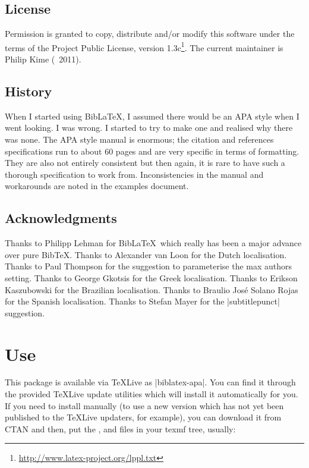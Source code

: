 \documentclass{ltxdockit}
\begin{document}
\subsection{License}

Permission is granted to copy, distribute and/or modify this software under
the terms of the \latex Project Public License, version
1.3c\footnote{\url{http://www.latex-project.org/lppl.txt}}. The current
maintainer is Philip Kime (\textcopyright\ 2011).

\subsection{History}

When I started using Bib\LaTeX, I assumed there would be an APA style
when I went looking. I was wrong. I started to try to make one and realised
why there was none. The APA style manual is enormous; the citation and
references specifications run to about 60 pages and are very specific in
terms of formatting. They are also not entirely consistent but then again,
it is rare to have such a thorough specification to work from.
Inconsistencies in the manual and workarounds are noted in the examples
document.

\subsection{Acknowledgments}

Thanks to Philipp Lehman for Bib\LaTeX\ which really has been a major
advance over pure Bib\TeX. Thanks to Alexander van Loon for the Dutch
localisation. Thanks to Paul Thompson for the suggestion to
parameterise the max authors setting. Thanks to George Gkotsis for the
Greek localisation. Thanks to Erikson Kaszubowski for the Brazilian
localisation. Thanks to Braulio José Solano Rojas for the Spanish
localisation. Thanks to Stefan Mayer for the |subtitlepunct| suggestion.

\section{Use}\label{ref:use}
\label{use}
This package is available via \TeX Live as |biblatex-apa|. You can find it
through the provided \TeX Live update utilities which will install it
automatically for you. If you need to install manually (to use a new
version which has not yet been published to the \TeX Live updaters, for
example), you can download it from CTAN and then, put the ,
 and  files in your texmf tree, usually:\\ 
\end{document}
